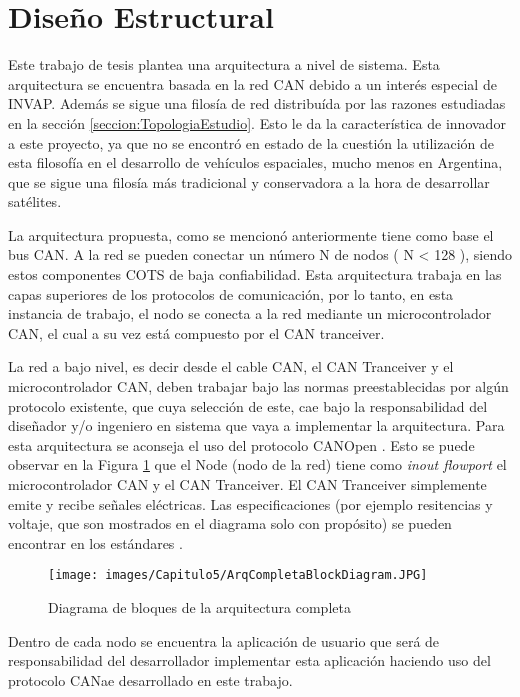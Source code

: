 \section{Diseño Estructural}
Este trabajo de tesis plantea una arquitectura a nivel de sistema.
Esta arquitectura se encuentra basada en la red CAN debido a
un interés especial de INVAP. Además se sigue una filosía de red
distribuída por las razones estudiadas en la sección
\ref{seccion:TopologiaEstudio}. Esto le da la característica de innovador
a este proyecto, ya que no se encontró en estado de la cuestión
la utilización de esta filosofía en el desarrollo de vehículos
espaciales, mucho menos en Argentina, que se sigue una filosía
más tradicional y conservadora a la hora de desarrollar satélites. 

La arquitectura propuesta, como se mencionó anteriormente tiene como
base el bus CAN. A la red se pueden conectar un número N de
nodos ( N < 128 ), siendo estos componentes COTS de baja confiabilidad. 
Esta arquitectura trabaja en las capas superiores 
de los protocolos de comunicación, por lo tanto, en esta instancia 
de trabajo, el nodo se conecta a la red mediante un microcontrolador 
CAN, el cual a su vez está compuesto por el CAN tranceiver.

La red a bajo nivel, es decir desde el cable CAN, el CAN Tranceiver y 
el microcontrolador CAN, deben trabajar bajo las normas preestablecidas
por algún protocolo existente, que cuya selección de este, cae bajo la 
responsabilidad del diseñador y/o ingeniero en sistema que vaya 
a implementar la arquitectura. Para esta arquitectura se aconseja el uso
del protocolo CANOpen \citep{can-ciaWEB}. Esto se puede observar en la
 Figura \ref{fig:DiagramaEstructuraCompleta} que el Node (nodo de la red)
tiene como \textit{inout flowport} el microcontrolador CAN  y el
CAN Tranceiver. El CAN Tranceiver simplemente emite y recibe señales eléctricas. Las 
especificaciones (por ejemplo resitencias y voltaje, que son mostrados en el diagrama
solo con propósito) se pueden encontrar en los estándares \citep{can-ciaWEB}.

\begin{figure}[h!]
 \centering
 \texttt{[image: images/Capitulo5/ArqCompletaBlockDiagram.JPG]}
  \caption{Diagrama de bloques de la arquitectura completa}
\label{fig:DiagramaEstructuraCompleta}
\end{figure} 

Dentro de cada nodo se encuentra la aplicación de usuario que será de 
responsabilidad del desarrollador implementar esta aplicación haciendo uso
del protocolo CANae desarrollado en este trabajo.

